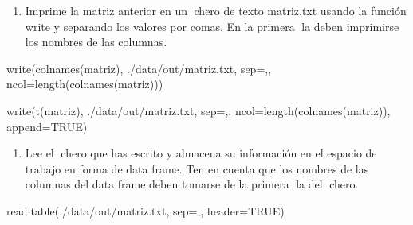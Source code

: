 \documentclass[
]{article}
\newenvironment{Shaded}{\begin{snugshade}}{\end{snugshade}}
\newcommand{\AttributeTok}[1]{\textcolor[rgb]{0.77,0.63,0.00}{#1}}
\newcommand{\ConstantTok}[1]{\textcolor[rgb]{0.00,0.00,0.00}{#1}}
\newcommand{\FunctionTok}[1]{\textcolor[rgb]{0.00,0.00,0.00}{#1}}
\newcommand{\NormalTok}[1]{#1}
\newcommand{\StringTok}[1]{\textcolor[rgb]{0.31,0.60,0.02}{#1}}
\providecommand{\tightlist}{%
  \setlength{\itemsep}{0pt}\setlength{\parskip}{0pt}}
\begin{document}
\begin{enumerate}
\def\labelenumi{\arabic{enumi}.}
\setcounter{enumi}{1}
\tightlist
\item
  Imprime la matriz anterior en un chero de texto matriz.txt usando la
  función write y separando los valores por comas. En la primera la
  deben imprimirse los nombres de las columnas.
\end{enumerate}

\begin{Shaded}
\begin{Highlighting}[]
\FunctionTok{write}\NormalTok{(}\FunctionTok{colnames}\NormalTok{(matriz), }\StringTok{\textquotesingle{}./data/out/matriz.txt\textquotesingle{}}\NormalTok{, }\AttributeTok{sep=}\StringTok{\textquotesingle{},\textquotesingle{}}\NormalTok{, }\AttributeTok{ncol=}\FunctionTok{length}\NormalTok{(}\FunctionTok{colnames}\NormalTok{(matriz)))}
\end{Highlighting}
\end{Shaded}

\begin{Shaded}
\begin{Highlighting}[]
\FunctionTok{write}\NormalTok{(}\FunctionTok{t}\NormalTok{(matriz), }\StringTok{\textquotesingle{}./data/out/matriz.txt\textquotesingle{}}\NormalTok{, }\AttributeTok{sep=}\StringTok{\textquotesingle{},\textquotesingle{}}\NormalTok{, }\AttributeTok{ncol=}\FunctionTok{length}\NormalTok{(}\FunctionTok{colnames}\NormalTok{(matriz)), }\AttributeTok{append=}\ConstantTok{TRUE}\NormalTok{)}
\end{Highlighting}
\end{Shaded}

\begin{enumerate}
\def\labelenumi{\arabic{enumi}.}
\setcounter{enumi}{2}
\tightlist
\item
  Lee el chero que has escrito y almacena su información en el espacio
  de trabajo en forma de data frame. Ten en cuenta que los nombres de
  las columnas del data frame deben tomarse de la primera la del
  chero.
\end{enumerate}

\begin{Shaded}
\begin{Highlighting}[]
\FunctionTok{read.table}\NormalTok{(}\StringTok{\textquotesingle{}./data/out/matriz.txt\textquotesingle{}}\NormalTok{, }\AttributeTok{sep=}\StringTok{\textquotesingle{},\textquotesingle{}}\NormalTok{, }\AttributeTok{header=}\ConstantTok{TRUE}\NormalTok{)}
\end{Highlighting}
\end{Shaded}
\end{document}
